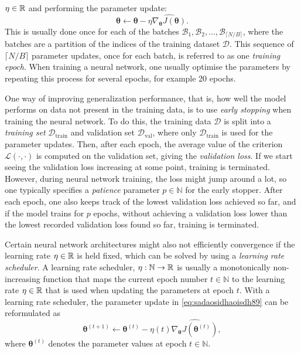 \documentclass{statsmsc}
\begin{document}
{$\eta \in \mathbb{R}$ and performing the parameter update:
\begin{equation}\label{eq:sadaosidhaoisdh89}
    \bm\theta \leftarrow \bm\theta - \eta \widehat{\nabla_{\bm\theta} J(\bm\theta)}.
\end{equation}
This is usually done once for each of the batches
$\mathcal{B}_1,\mathcal{B}_2,\dots, \mathcal{B}_{\lceil N / B \rceil}$, where
the batches are a partition of the indices of the training dataset
$\mathcal{D}$. This sequence of $\lceil N / B \rceil$ parameter updates, once for each batch, is
referred to as one \textit{training epoch}.
When training a neural network, one usually optimise the parameters by repeating this process
for several epochs, for example 20 epochs.


One way of improving generalization performance, that is, how well the model performs on data
not present in the training data, is to use \textit{early stopping} when training the neural
network. To do this, the training data $\mathcal{D}$ is split into a \textit{training set}
$\mathcal{D}_{\textrm{train}}$ and validation set $\mathcal{D}_{\textrm{val}}$, where only
$\mathcal{D}_{\textrm{train}}$ is used for the parameter updates.
Then, after each epoch, the average value of the criterion $\mathcal{L}(\cdot,\cdot)$ is computed on
the validation set, giving the \textit{validation loss}. If we start seeing the validation loss
increasing at some point, training is terminated. However, during neural network training, the loss
might jump around a lot, so one typically specifies a
\textit{patience} parameter $p\in\mathbb{N}$
for the early stopper. After each epoch, one also keeps track of the lowest validation loss achieved
so far, and if the model trains for $p$ epochs, without achieving a validation
loss lower than the lowest recorded validation loss found so far, training is terminated.

Certain neural network architectures might also not efficiently convergence if the learning
rate $\eta \in \mathbb{R}$ is held fixed, which can be solved by using a \textit{learning rate scheduler}.
A learning rate scheduler, $\eta: \mathbb{N} \rightarrow {\mathbb{R}}$ is usually a
monotonically non-increasing function that maps the current epoch number $t \in \mathbb{N}$
to the learning rate $\eta \in \mathbb{R}$ that is used when updating the parameters at epoch $t$. With
a learning rate scheduler, the parameter update in \cref{eq:sadaosidhaoisdh89} can be reformulated
as
\begin{equation}
    \bm\theta^{(t+1)} \leftarrow \bm\theta^{(t)} - \eta(t) \widehat{\nabla_{\bm\theta} J\left(\bm\theta^{(t)}\right)},
\end{equation}
where $\bm\theta^{(t)}$ denotes the parameter values at epoch $t \in \mathbb{N}$.

}
\end{document}
